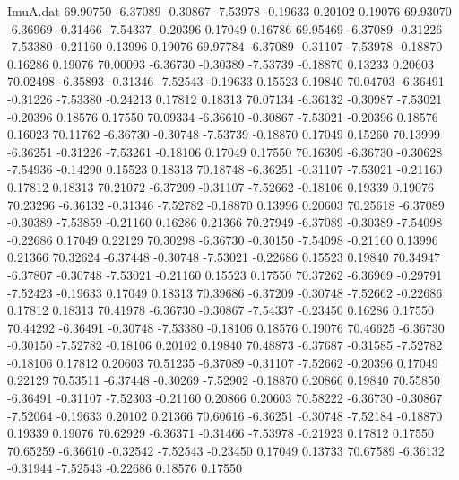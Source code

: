 \begin{filecontents}{ImuA.dat}
  69.90750   -6.37089   -0.30867   -7.53978   -0.19633    0.20102    0.19076
  69.93070   -6.36969   -0.31466   -7.54337   -0.20396    0.17049    0.16786
  69.95469   -6.37089   -0.31226   -7.53380   -0.21160    0.13996    0.19076
  69.97784   -6.37089   -0.31107   -7.53978   -0.18870    0.16286    0.19076
  70.00093   -6.36730   -0.30389   -7.53739   -0.18870    0.13233    0.20603
  70.02498   -6.35893   -0.31346   -7.52543   -0.19633    0.15523    0.19840
  70.04703   -6.36491   -0.31226   -7.53380   -0.24213    0.17812    0.18313
  70.07134   -6.36132   -0.30987   -7.53021   -0.20396    0.18576    0.17550
  70.09334   -6.36610   -0.30867   -7.53021   -0.20396    0.18576    0.16023
  70.11762   -6.36730   -0.30748   -7.53739   -0.18870    0.17049    0.15260
  70.13999   -6.36251   -0.31226   -7.53261   -0.18106    0.17049    0.17550
  70.16309   -6.36730   -0.30628   -7.54936   -0.14290    0.15523    0.18313
  70.18748   -6.36251   -0.31107   -7.53021   -0.21160    0.17812    0.18313
  70.21072   -6.37209   -0.31107   -7.52662   -0.18106    0.19339    0.19076
  70.23296   -6.36132   -0.31346   -7.52782   -0.18870    0.13996    0.20603
  70.25618   -6.37089   -0.30389   -7.53859   -0.21160    0.16286    0.21366
  70.27949   -6.37089   -0.30389   -7.54098   -0.22686    0.17049    0.22129
  70.30298   -6.36730   -0.30150   -7.54098   -0.21160    0.13996    0.21366
  70.32624   -6.37448   -0.30748   -7.53021   -0.22686    0.15523    0.19840
  70.34947   -6.37807   -0.30748   -7.53021   -0.21160    0.15523    0.17550
  70.37262   -6.36969   -0.29791   -7.52423   -0.19633    0.17049    0.18313
  70.39686   -6.37209   -0.30748   -7.52662   -0.22686    0.17812    0.18313
  70.41978   -6.36730   -0.30867   -7.54337   -0.23450    0.16286    0.17550
  70.44292   -6.36491   -0.30748   -7.53380   -0.18106    0.18576    0.19076
  70.46625   -6.36730   -0.30150   -7.52782   -0.18106    0.20102    0.19840
  70.48873   -6.37687   -0.31585   -7.52782   -0.18106    0.17812    0.20603
  70.51235   -6.37089   -0.31107   -7.52662   -0.20396    0.17049    0.22129
  70.53511   -6.37448   -0.30269   -7.52902   -0.18870    0.20866    0.19840
  70.55850   -6.36491   -0.31107   -7.52303   -0.21160    0.20866    0.20603
  70.58222   -6.36730   -0.30867   -7.52064   -0.19633    0.20102    0.21366
  70.60616   -6.36251   -0.30748   -7.52184   -0.18870    0.19339    0.19076
  70.62929   -6.36371   -0.31466   -7.53978   -0.21923    0.17812    0.17550
  70.65259   -6.36610   -0.32542   -7.52543   -0.23450    0.17049    0.13733
  70.67589   -6.36132   -0.31944   -7.52543   -0.22686    0.18576    0.17550

\end{filecontents}
